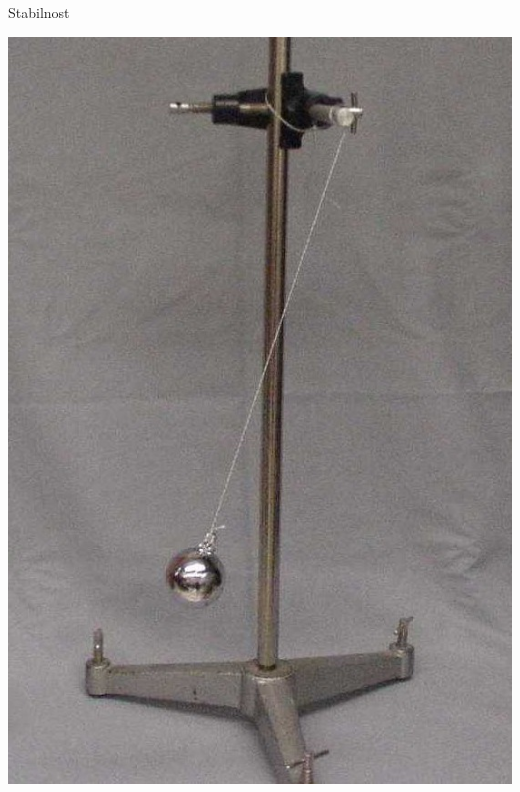\documentclass{beamer}
\begin{document}
\begin{frame}{Stabilnost}
\begin{center}
\includegraphics[height=0.8\textheight]{./Slike/SimplePendulum3} \quad

\end{center}
\end{frame}
\end{document}
